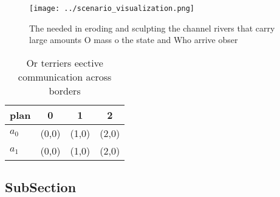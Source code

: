 \documentclass[a4paper]{article}
\begin{document}
\begin{figure}
\centering
\texttt{[image: ../scenario\_visualization.png]}
\caption{The needed in eroding and sculpting the channel rivers that carry large amounts O mass o the state and Who arrive obser
}
\end{figure}
 
\begin{table}
\begin{adjustbox}{width=0.6\columnwidth}
\begin{tabular}{|l|l|l|l|}
\hline
\textbf{plan} & \multicolumn{1}{c|}{\textbf{0}} & \multicolumn{1}{c|}{\textbf{1}} & \multicolumn{1}{c|}{\textbf{2}} \\ \hline
\textbf{$a_0$}  & (0,0) & (1,0) & (2,0) \\ \hline
\textbf{$a_1$}  & (0,0) & (1,0) & (2,0) \\ \hline
\end{tabular}
\end{adjustbox}
\caption{Or terriers eective communication across borders 
}
\end{table}

\subsection{SubSection}
\end{document}
